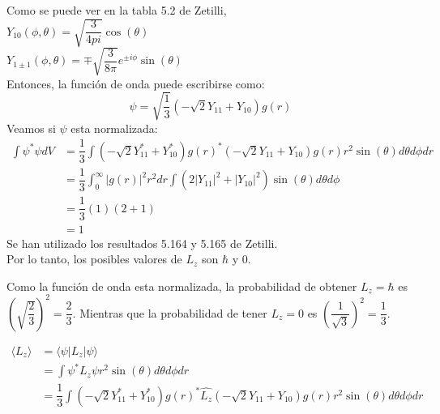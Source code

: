 \begin{solution}
  \begin{parts}
	\item Como se puede ver en la tabla 5.2 de Zetilli,\\
	
	 $Y_{10}(\phi,\theta)=\sqrt{\dfrac{3}{4 pi}} \cos(\theta)$\\
	 
	 $Y_{1 \pm 1}(\phi,\theta)=\mp \sqrt{\dfrac{3}{8 \pi}}e^{\pm i \phi} \sin(\theta)$\\
	    
	Entonces, la funci\'{o}n de onda puede escribirse como:
 \begin{equation*}
     \psi=\sqrt{\dfrac{1}{3}} \left( -\sqrt{2} Y_{11} + Y_{10}\right)g(r)
 \end{equation*}
	Veamos si $\psi$ esta normalizada:
\begin{equation*}
\begin{aligned}
 \int \psi^{*} \psi dV&=\dfrac{1}{3}\int \left( -\sqrt{2}Y_{11}^{*} + Y_{10}^{*}\right)g(r)^{*} \left( -\sqrt{2} Y_{11}+Y_{10}\right)g(r) r^2 \sin(\theta) d \theta d\phi dr \\
 &= \dfrac{1}{3}\int_0 ^{\infty} |g(r)|^2 r^2 dr \int \left( 2|Y_{11}|^2 + |Y_{10}|^2  \right)\sin(\theta) d\theta d\phi\\
 &=\dfrac{1}{3} \left( 1\right) \left(2+1\right)\\
 &=1
 \end{aligned}\label{Norm}
\end{equation*}
Se han utilizado los resultados 5.164 y 5.165 de Zetilli.
\\
Por lo tanto, los posibles valores de $L_z$ son $\hbar$ y $0$.

\item Como la funci\'{o}n de onda  esta normalizada, la probabilidad de obtener $L_z=\hbar$ es $\left(\sqrt{\dfrac{2}{3}}\right)^2=\dfrac{2}{3}$. Mientras que la probabilidad de tener $L_z=0$ es $\left(\dfrac{1}{\sqrt{3}}\right)^2=\dfrac{1}{3}$.

\item 
\begin{equation*}
\begin{aligned}
 \langle L_z \rangle &=\langle \psi| L_z |\psi \rangle \\
 &= \int \psi^{*} L_z \psi r^2 \sin(\theta) d \theta d\phi dr \\
 &=\dfrac{1}{3}\int \left( -\sqrt{2}Y_{11}^{*} + Y_{10}^{*}\right)g(r)^{*} \hat{L_z} \left( -\sqrt{2} Y_{11}+Y_{10}\right)g(r) r^2 \sin(\theta) d \theta d\phi dr\\
\end{aligned}\label{Norm}
\end{equation*}


\end{parts}
\end{solution}
